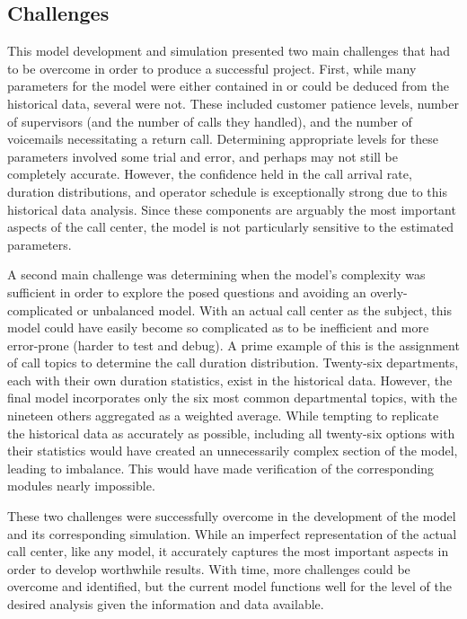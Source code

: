 \documentclass[12pt,twocolumn]{article}
\begin{document}
	\subsection{Challenges}

	This model development and simulation presented two main challenges that had to be overcome in order to produce a successful project.  First, while many parameters for the model were either contained in or could be deduced from the historical data, several were not.  These included customer patience levels, number of supervisors (and the number of calls they handled), and the number of voicemails necessitating a return call.  Determining appropriate levels for these parameters involved some trial and error, and perhaps may not still be completely accurate.  However, the confidence held in the call arrival rate, duration distributions, and operator schedule is exceptionally strong due to this historical data analysis.  Since these components are arguably the most important aspects of the call center, the model is not particularly sensitive to the estimated parameters.
	
	\par
	
	A second main challenge was determining when the model's complexity was sufficient in order to explore the posed questions and avoiding an overly-complicated or unbalanced model.  With an actual call center as the subject, this model could have easily become so complicated as to be inefficient and more error-prone (harder to test and debug).  A prime example of this is the assignment of call topics to determine the call duration distribution.  Twenty-six departments, each with their own duration statistics, exist in the historical data.  However, the final model incorporates only the six most common departmental topics, with the nineteen others aggregated as a weighted average.  While tempting to replicate the historical data as accurately as possible, including all twenty-six options with their statistics would have created an unnecessarily complex section of the model, leading to imbalance.  This would have made verification of the corresponding modules nearly impossible.
	
	\par
	
	These two challenges were successfully overcome in the development of the model and its corresponding simulation.  While an imperfect representation of the actual call center, like any model, it accurately captures the most important aspects in order to develop worthwhile results.  With time, more challenges could be overcome and identified, but the current model functions well for the level of the desired analysis given the information and data available.
\end{document}
